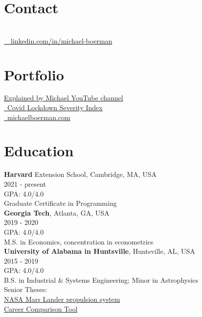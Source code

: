 \documentclass[margin,line]{res}
\begin{document}

\begin{resume}
\section{\sc Contact}
\vspace{.05in}

 \\
\faLinkedinIn  \href{https://wwwlinkedin.com/in/michael-boerman}{\ttfamily \, \, linkedin.com/in/michael-boerman}\\

\section{\sc Portfolio}
 \href{https://www.youtube.com/channel/UCxFMrMb6PrS7SOrQi-BfMUw/videos?view=0&sort=p&flow=grid}{ Explained by Michael YouTube channel}\\
\faChartLine \href{https://github.com/michaelboerman/lockdown_severity_index#readme}{\, Covid Lockdown Severity Index}\\
\faMediumM \href{https://michaelboerman.com/}{\ttfamily  \, michaelboerman.com}\\


\section{\sc Education}
{\bf Harvard} Extension School, Cambridge, MA, USA\\
2021 - present\\
GPA: 4.0/4.0\\
Graduate Certificate in Programming\\

{\bf Georgia Tech}, Atlanta, GA, USA\\
2019 - 2020\\
GPA: 4.0/4.0\\
M.S. in Economics, concentration in econometrics\\

{\bf University of Alabama in Huntsville}, Huntsville, AL, USA\\
2015 - 2019\\
GPA: 4.0/4.0\\
B.S. in Industrial \& Systems Engineering; Minor in Astrophysics\\
Senior Theses: \\
\hspace{5mm}{\it -- Systems Engineering:} \href{https://tinyurl.com/ISEEM-SD}{NASA Mars Lander propulsion system}\\
\hspace{5mm}{\it -- Economic Decision Analysis:} \href{http://tinyurl.com/BoermanCareerChoice
}{Career Comparison Tool}


\end{resume}
\end{document}
